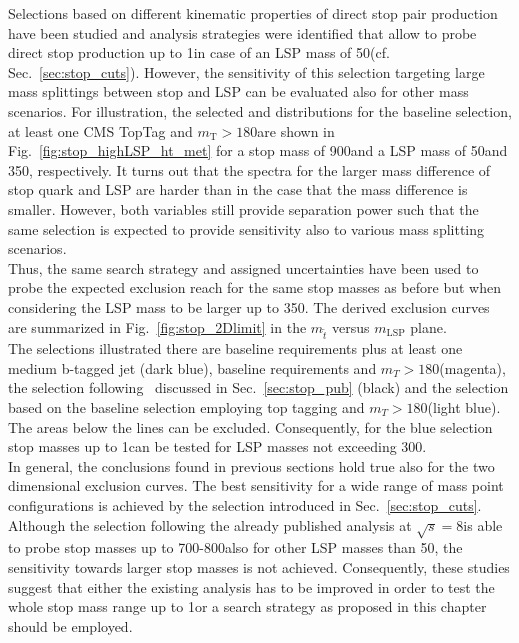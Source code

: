 Selections based on different kinematic properties of direct stop pair production have been studied and analysis strategies were identified that allow to probe direct stop production up to 1\tev in case of an LSP mass of 50\gev (cf. Sec.~\ref{sec:stop_cuts}). However, the sensitivity of this selection targeting large mass splittings between stop and LSP can be evaluated also for other mass scenarios. For illustration, the selected \HT and \met distributions for the baseline selection, at least one CMS TopTag and $m_\mathrm{T} > 180$\gev are shown in Fig.~\ref{fig:stop_highLSP_ht_met} for a stop mass of 900\gev and a LSP mass of 50\gev and 350\gev, respectively. It turns out that the spectra for the larger mass difference of stop quark and LSP are harder than in the case that the mass difference is smaller. However, both variables still provide separation power such that the same selection is expected to provide sensitivity also to various mass splitting scenarios. \\
Thus, the same search strategy and assigned uncertainties have been used to probe the expected exclusion reach for the same stop masses as before but when considering the LSP mass to be larger up to 350\gev. The derived exclusion curves are summarized in Fig.~\ref{fig:stop_2Dlimit} in the $m_{\tilde{t}}$ versus $m_\mathrm{LSP}$ plane. \\
The selections illustrated there are baseline requirements plus at least one medium b-tagged jet (dark blue), baseline requirements and $m_T > 180$\gev (magenta), the selection following~\cite{CMS-PAS-SUS-13-015} discussed in Sec.~\ref{sec:stop_pub} (black) and the selection based on the baseline selection employing top tagging and $m_T > 180$\gev (light blue). The areas below the lines can be excluded. Consequently, for the blue selection stop masses up to 1\tev can be tested for LSP masses not exceeding 300\gev. \\
In general, the conclusions found in previous sections hold true also for the two dimensional exclusion curves. The best sensitivity for a wide range of mass point configurations is achieved by the selection introduced in Sec.~\ref{sec:stop_cuts}. Although the selection following the already published analysis at $\sqrt{s} = 8$\tev is able to probe stop masses up to 700-800\gev also for other LSP masses than 50\gev, the sensitivity towards larger stop masses is not achieved. Consequently, these studies suggest that either the existing analysis has to be improved in order to test the whole stop mass range up to 1\tev or a search strategy as proposed in this chapter should be employed. 
